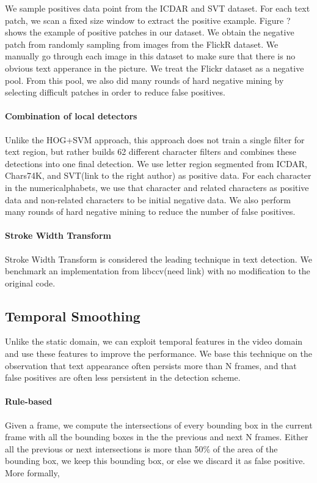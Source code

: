 \documentclass{bmvc2k}
\begin{document}
We sample positives data point from the ICDAR and SVT dataset. For each text patch, we scan a fixed size window to extract the positive example. Figure ? shows the example of positive patches in our dataset. We obtain the negative patch from randomly sampling from images from the FlickR dataset. We manually go through each image in this dataset to make sure that there is no obvious text apperance in the picture. We treat the Flickr dataset as a negative pool. From this pool, we also did many rounds of hard negative mining by selecting difficult patches in order to reduce false positives.

\paragraph{Combination of local detectors} Unlike the HOG+SVM approach, this approach does not train a single filter for text region, but rather builds 62 different character filters and combines these detections into one final detection. We use letter region segmented from ICDAR, Chars74K, and SVT(link to the right author) as positive data. For each character in the numericalphabets, we use that character and related characters as positive data and non-related characters to be initial negative data. We also perform many rounds of hard negative mining to reduce the number of false positives.

\paragraph{Stroke Width Transform} Stroke Width Transform\cite{swt10} is considered the leading technique in text detection. We benchmark an implementation from libccv(need link) with no modification to the original code.

\subsection{Temporal Smoothing} Unlike the static domain, we can exploit temporal features in the video domain and use these features to improve the performance. We base this technique on the observation that text appearance often persists more than N frames, and that false positives are often less persistent in the detection scheme.
\paragraph{Rule-based} Given a frame, we compute the intersections of every bounding box in the current frame with all the bounding boxes in the the previous and next N frames. Either all the previous or next intersections is more than 50\% of the area of the bounding box, we keep this bounding box, or else we discard it as false positive. More formally,
\end{document}

